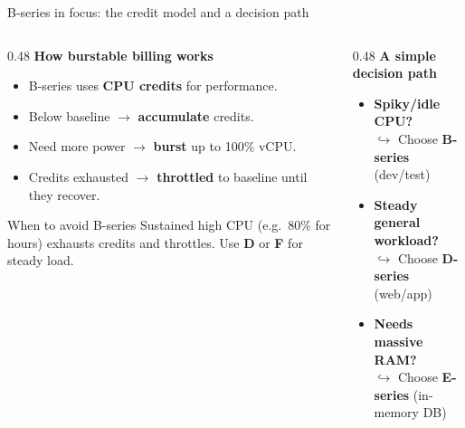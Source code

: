 \documentclass[aspectratio=169,xcolor=dvipsnames]{beamer}
\begin{document}
	\begin{frame}[shrink=15]{B-series in focus: the credit model and a decision path}
		\begin{columns}[T]
			\begin{column}{0.48\textwidth}
				\vspace{0.2cm}
				\textbf{\large How burstable billing works}
				
				\vspace{0.3cm}
				\begin{itemize}
					\setlength{\itemsep}{0.8em}
					\item B-series uses \textbf{CPU credits} for performance.
					\item Below baseline $\rightarrow$ \textbf{accumulate} credits.
					\item Need more power $\rightarrow$ \textbf{burst} up to 100\% vCPU.
					\item Credits exhausted $\rightarrow$ \textbf{throttled} to baseline until they recover.
				\end{itemize}
				
				\vspace{0.4cm}
				\begin{exampleblock}{When to avoid B-series}
					Sustained high CPU (e.g.\ 80\% for hours) exhausts credits and throttles. Use \textbf{D} or \textbf{F} for steady load.
				\end{exampleblock}
			\end{column}
			
			\begin{column}{0.48\textwidth}
				\vspace{0.2cm}
				\textbf{\large A simple decision path}
				
				\vspace{0.3cm}
				\begin{itemize}
					\setlength{\itemsep}{0.8em}
					\item \textbf{Spiky/idle CPU?} \\
					$\hookrightarrow$ Choose \textbf{B-series} (dev/test)
					
					\item \textbf{Steady general workload?} \\
					$\hookrightarrow$ Choose \textbf{D-series} (web/app)
					
					\item \textbf{Needs massive RAM?} \\
					$\hookrightarrow$ Choose \textbf{E-series} (in-memory DB)
					

\end{itemize}
\end{column}
\end{columns}
\end{frame}
\end{document}

